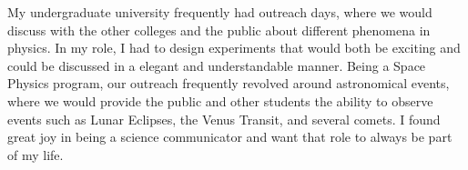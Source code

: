 \documentclass[12pt]{article}
\begin{document}
My undergraduate university frequently had outreach days, where we would discuss
with the other colleges and the public about different phenomena in physics. In
my role, I had to design experiments that would both be exciting and could be
discussed in a elegant and understandable manner. Being a Space Physics program,
our outreach frequently revolved around astronomical events, where we would
provide the public and other students the ability to observe events such as
Lunar Eclipses, the Venus Transit, and several comets. I found great joy in
being a science communicator and want that role to always be part of my life. 




%
%
\end{document}
